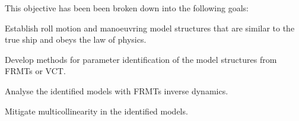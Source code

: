 This objective has been been broken down into the following goals:
\begin{tcolorbox}[sharp corners,title=Goal A]
    Establish roll motion and manoeuvring model structures that are similar to the true ship and obeys the law of physics.
    \tcblower
\end{tcolorbox}

\begin{tcolorbox}[sharp corners,title=Goal B]
    Develop methods for parameter identification of the model structures from FRMTs or VCT.
    \tcblower
\end{tcolorbox}

\begin{tcolorbox}[sharp corners,title=Goal C]
    Analyse the identified models with FRMTs inverse dynamics.
    \tcblower
\end{tcolorbox}

\begin{tcolorbox}[sharp corners,title=Goal D]
    Mitigate multicollinearity in the identified models.
    \tcblower
\end{tcolorbox}

%

